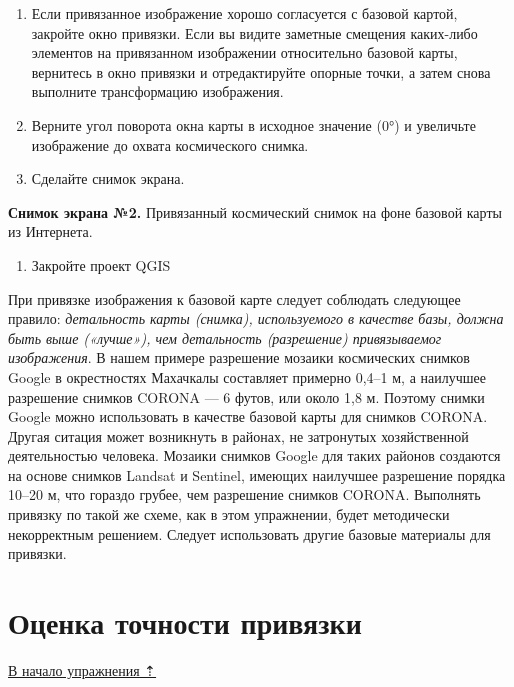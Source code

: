 \documentclass[
  12pt,
]{book}
\providecommand{\tightlist}{%
  \setlength{\itemsep}{0pt}\setlength{\parskip}{0pt}}
\begin{document}
\begin{enumerate}
\def\labelenumi{\arabic{enumi}.}
\setcounter{enumi}{10}
\item
  Если привязанное изображение хорошо согласуется с базовой картой, закройте окно привязки. Если вы видите заметные смещения каких-либо элементов на привязанном изображении относительно базовой карты, вернитесь в окно привязки и отредактируйте опорные точки, а затем снова выполните трансформацию изображения.
\item
  Верните угол поворота окна карты в исходное значение (0°) и увеличьте изображение до охвата космического снимка.
\item
  Сделайте снимок экрана.
\end{enumerate}

\textbf{Снимок экрана №2.} Привязанный космический снимок на фоне базовой карты из Интернета.

\begin{enumerate}
\def\labelenumi{\arabic{enumi}.}
\setcounter{enumi}{13}
\tightlist
\item
  Закройте проект QGIS
\end{enumerate}

При привязке изображения к базовой карте следует соблюдать следующее правило: \emph{детальность карты (снимка), используемого в качестве базы, должна быть выше («лучше»), чем детальность (разрешение) привязываемог изображения}. В нашем примере разрешение мозаики космических снимков Google в окрестностях Махачкалы составляет примерно 0,4--1 м, а наилучшее разрешение снимков CORONA --- 6 футов, или около 1,8 м. Поэтому снимки Google можно использовать в качестве базовой карты для снимков CORONA. Другая ситация может возникнуть в районах, не затронутых хозяйственной деятельностью человека. Мозаики снимков Google для таких районов создаются на основе снимков Landsat и Sentinel, имеющих наилучшее разрешение порядка 10--20 м, что гораздо грубее, чем разрешение снимков CORONA. Выполнять привязку по такой же схеме, как в этом упражнении, будет методически некорректным решением. Следует использовать другие базовые материалы для привязки.

\hypertarget{raster-reference-accuracy}{%
\section{Оценка точности привязки}\label{raster-reference-accuracy}}

\protect\hyperlink{raster-reference}{В начало упражнения ⇡}
\end{document}
